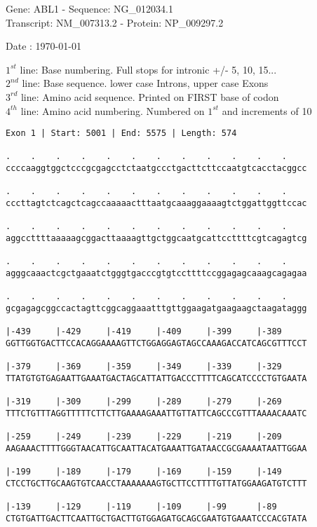 \documentclass{article}
\begin{document}
\begin{center}
\begin{large}
Gene: ABL1 - Sequence: NG\_012034.1\\
Transcript: NM\_007313.2 - Protein: NP\_009297.2
 
 Date : \today
\end{large}
\end{center}
$1^{st}$ line: Base numbering. Full stops for intronic +/- 5, 10, 15...\\
$2^{nd}$ line: Base sequence. lower case Introns, upper case Exons\\
$3^{rd}$ line: Amino acid sequence. Printed on FIRST base of codon\\
$4^{th}$ line: Amino acid numbering. Numbered on $1^{st}$ and increments of 10\\
\begin{Verbatim}[fontfamily=courier]
Exon 1 | Start: 5001 | End: 5575 | Length: 574

.    .    .    .    .    .    .    .    .    .    .    .    
ccccaaggtggctcccgcgagcctctaatgccctgacttcttccaatgtcacctacggcc

.    .    .    .    .    .    .    .    .    .    .    .    
cccttagtctcagctcagccaaaaactttaatgcaaaggaaaagtctggattggttccac

.    .    .    .    .    .    .    .    .    .    .    .    
aggccttttaaaaagcggacttaaaagttgctggcaatgcattccttttcgtcagagtcg

.    .    .    .    .    .    .    .    .    .    .    .    
agggcaaactcgctgaaatctgggtgacccgtgtccttttccggagagcaaagcagagaa

.    .    .    .    .    .    .    .    .    .    .    .    
gcgagagcggccactagttcggcaggaaatttgttggaagatgaagaagctaagataggg

|-439     |-429     |-419     |-409     |-399     |-389     
GGTTGGTGACTTCCACAGGAAAAGTTCTGGAGGAGTAGCCAAAGACCATCAGCGTTTCCT

|-379     |-369     |-359     |-349     |-339     |-329     
TTATGTGTGAGAATTGAAATGACTAGCATTATTGACCCTTTTCAGCATCCCCTGTGAATA

|-319     |-309     |-299     |-289     |-279     |-269     
TTTCTGTTTAGGTTTTTCTTCTTGAAAAGAAATTGTTATTCAGCCCGTTTAAAACAAATC

|-259     |-249     |-239     |-229     |-219     |-209     
AAGAAACTTTTGGGTAACATTGCAATTACATGAAATTGATAACCGCGAAAATAATTGGAA

|-199     |-189     |-179     |-169     |-159     |-149     
CTCCTGCTTGCAAGTGTCAACCTAAAAAAAGTGCTTCCTTTTGTTATGGAAGATGTCTTT

|-139     |-129     |-119     |-109     |-99      |-89      
CTGTGATTGACTTCAATTGCTGACTTGTGGAGATGCAGCGAATGTGAAATCCCACGTATA

\end{Verbatim}
\end{document}
